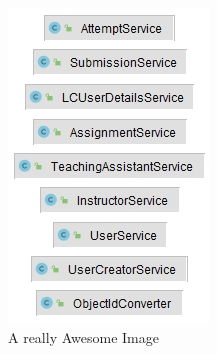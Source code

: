 \documentclass[a4paper, 12pt]{article}
\begin{document}
\begin{figure}[H]
{  \includegraphics[width=\linewidth]{small-groups/service-layer.jpg}
  \caption{A really Awesome Image}\label{fig:awesome_image2}
\endminipage}\hfill
{}
\end{figure}
\end{document}
